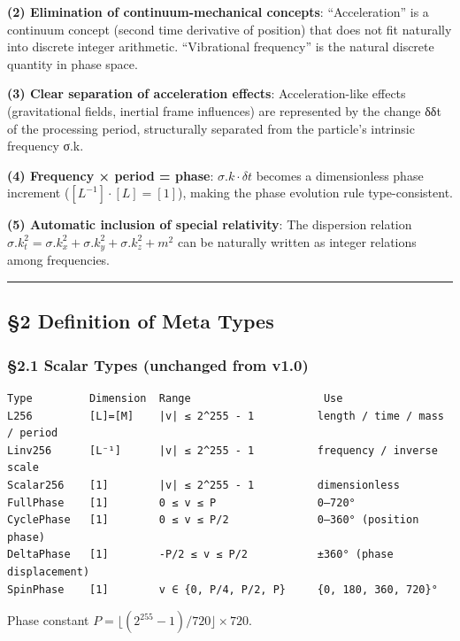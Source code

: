 \documentclass[a4paper,11pt]{article}
\begin{document}
\textbf{(2) Elimination of continuum-mechanical concepts}:
``Acceleration'' is a continuum concept (second time derivative of
position) that does not fit naturally into discrete integer arithmetic.
``Vibrational frequency'' is the natural discrete quantity in phase
space.

\textbf{(3) Clear separation of acceleration effects}: Acceleration-like
effects (gravitational fields, inertial frame influences) are
represented by the change δδt of the processing period, structurally
separated from the particle's intrinsic frequency σ.k.

\textbf{(4) Frequency × period = phase}: \(\sigma.k \cdot \delta t\)
becomes a dimensionless phase increment (\([L^{-1}] \cdot [L] = [1]\)),
making the phase evolution rule type-consistent.

\textbf{(5) Automatic inclusion of special relativity}: The dispersion
relation
\(\sigma.k_t^2 = \sigma.k_x^2 + \sigma.k_y^2 + \sigma.k_z^2 + m^2\) can
be naturally written as integer relations among frequencies.

\begin{center}\rule{0.5\linewidth}{0.5pt}\end{center}

\subsection{§2 Definition of Meta Types}\label{definition-of-meta-types}

\subsubsection{§2.1 Scalar Types (unchanged from
v1.0)}\label{scalar-types-unchanged-from-v1.0}

\begin{verbatim}
Type         Dimension  Range                     Use
L256         [L]=[M]    |v| ≤ 2^255 - 1          length / time / mass / period
Linv256      [L⁻¹]      |v| ≤ 2^255 - 1          frequency / inverse scale
Scalar256    [1]        |v| ≤ 2^255 - 1          dimensionless
FullPhase    [1]        0 ≤ v ≤ P                0–720°
CyclePhase   [1]        0 ≤ v ≤ P/2              0–360° (position phase)
DeltaPhase   [1]        -P/2 ≤ v ≤ P/2           ±360° (phase displacement)
SpinPhase    [1]        v ∈ {0, P/4, P/2, P}     {0, 180, 360, 720}°
\end{verbatim}

Phase constant \(P = \lfloor (2^{255}-1)/720 \rfloor \times 720\).
\end{document}
